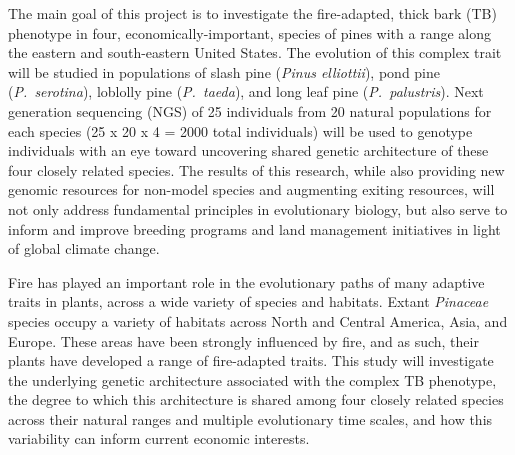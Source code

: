 


The main goal of this project is to investigate the fire-adapted, thick bark (TB) phenotype in four, economically-important, 
species of pines with a range along the eastern and south-eastern United States.  The evolution of this complex trait will 
be studied in populations of slash pine (\textit{Pinus elliottii}), pond pine (\textit{P.\ serotina}), loblolly pine (\textit{P.\ taeda}), 
and long leaf pine (\textit{P.\ palustris}).  Next generation sequencing (NGS) of 25 individuals from 20 natural populations for each 
species (25 x 20 x 4 = 2000 total individuals) will be used to genotype individuals with an eye toward uncovering shared 
genetic architecture of these four closely related species. The results of this research, while also providing new genomic 
resources for non-model species and augmenting exiting resources, will not only address fundamental principles in 
evolutionary biology, but also serve to inform and improve breeding programs and land management initiatives in 
light of global climate change.  

Fire has played an important role in the evolutionary paths of many adaptive traits in plants, across a wide variety of species 
and habitats.  Extant \textit{Pinaceae} species occupy a variety of habitats across North and Central America, Asia, and Europe.  
These areas have been strongly influenced by fire, and as such, their plants have developed a range 
of fire-adapted traits.  This study will investigate the underlying genetic architecture associated with the complex 
TB phenotype, the degree to which this architecture is shared among four closely related species across their natural 
ranges and multiple evolutionary time scales, and how this variability can inform current economic interests.  


